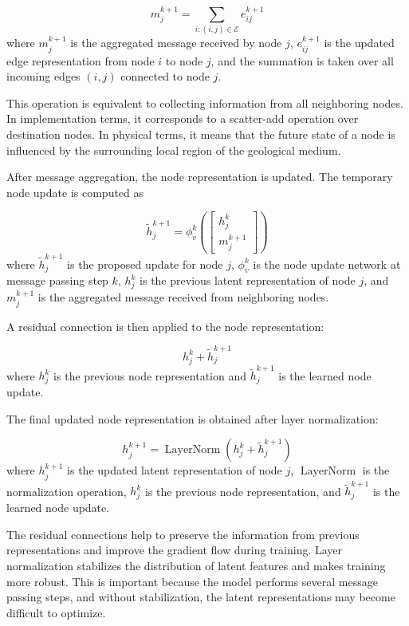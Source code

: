 \begin{equation}
m_j^{k+1}
=
\sum_{i:(i,j)\in\mathcal{E}}
e_{ij}^{k+1}
\end{equation}
where \(m_j^{k+1}\) is the aggregated message received by node \(j\), \(e_{ij}^{k+1}\) is the updated edge representation from node \(i\) to node \(j\), and the summation is taken over all incoming edges \((i,j)\) connected to node \(j\).

This operation is equivalent to collecting information from all neighboring nodes. In implementation terms, it corresponds to a scatter-add operation over destination nodes. In physical terms, it means that the future state of a node is influenced by the surrounding local region of the geological medium.

After message aggregation, the node representation is updated. The temporary node update is computed as

\begin{equation}
\tilde{h}_j^{k+1}
=
\phi_v^{k}
\left(
\begin{bmatrix}
h_j^k \\
m_j^{k+1}
\end{bmatrix}
\right)
\end{equation}
where \(\tilde{h}_j^{k+1}\) is the proposed update for node \(j\), \(\phi_v^{k}\) is the node update network at message passing step \(k\), \(h_j^k\) is the previous latent representation of node \(j\), and \(m_j^{k+1}\) is the aggregated message received from neighboring nodes.

A residual connection is then applied to the node representation:

\begin{equation}
h_j^k
+
\tilde{h}_j^{k+1}
\end{equation}
where \(h_j^k\) is the previous node representation and \(\tilde{h}_j^{k+1}\) is the learned node update.

The final updated node representation is obtained after layer normalization:

\begin{equation}
h_j^{k+1}
=
\operatorname{LayerNorm}
\left(
h_j^k
+
\tilde{h}_j^{k+1}
\right)
\end{equation}
where \(h_j^{k+1}\) is the updated latent representation of node \(j\), \(\operatorname{LayerNorm}\) is the normalization operation, \(h_j^k\) is the previous node representation, and \(\tilde{h}_j^{k+1}\) is the learned node update.

The residual connections help to preserve the information from previous representations and improve the gradient flow during training. Layer normalization stabilizes the distribution of latent features and makes training more robust. This is important because the model performs several message passing steps, and without stabilization, the latent representations may become difficult to optimize.
